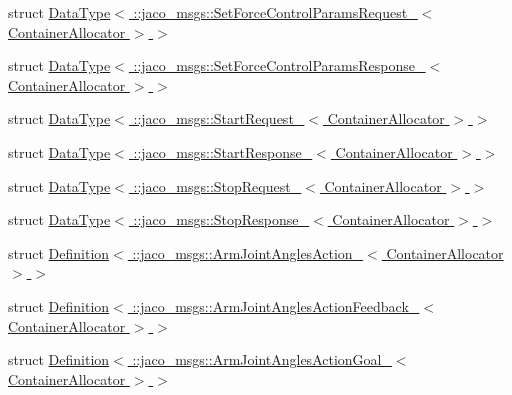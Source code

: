 \begin{DoxyCompactItemize}
\item 
struct \hyperlink{structros_1_1message__traits_1_1DataType_3_01_1_1jaco__msgs_1_1SetForceControlParamsRequest___3_01ContainerAllocator_01_4_01_4}{Data\+Type$<$ \+::jaco\+\_\+msgs\+::\+Set\+Force\+Control\+Params\+Request\+\_\+$<$ Container\+Allocator $>$ $>$}
\item 
struct \hyperlink{structros_1_1message__traits_1_1DataType_3_01_1_1jaco__msgs_1_1SetForceControlParamsResponse___3_01ContainerAllocator_01_4_01_4}{Data\+Type$<$ \+::jaco\+\_\+msgs\+::\+Set\+Force\+Control\+Params\+Response\+\_\+$<$ Container\+Allocator $>$ $>$}
\item 
struct \hyperlink{structros_1_1message__traits_1_1DataType_3_01_1_1jaco__msgs_1_1StartRequest___3_01ContainerAllocator_01_4_01_4}{Data\+Type$<$ \+::jaco\+\_\+msgs\+::\+Start\+Request\+\_\+$<$ Container\+Allocator $>$ $>$}
\item 
struct \hyperlink{structros_1_1message__traits_1_1DataType_3_01_1_1jaco__msgs_1_1StartResponse___3_01ContainerAllocator_01_4_01_4}{Data\+Type$<$ \+::jaco\+\_\+msgs\+::\+Start\+Response\+\_\+$<$ Container\+Allocator $>$ $>$}
\item 
struct \hyperlink{structros_1_1message__traits_1_1DataType_3_01_1_1jaco__msgs_1_1StopRequest___3_01ContainerAllocator_01_4_01_4}{Data\+Type$<$ \+::jaco\+\_\+msgs\+::\+Stop\+Request\+\_\+$<$ Container\+Allocator $>$ $>$}
\item 
struct \hyperlink{structros_1_1message__traits_1_1DataType_3_01_1_1jaco__msgs_1_1StopResponse___3_01ContainerAllocator_01_4_01_4}{Data\+Type$<$ \+::jaco\+\_\+msgs\+::\+Stop\+Response\+\_\+$<$ Container\+Allocator $>$ $>$}
\item 
struct \hyperlink{structros_1_1message__traits_1_1Definition_3_01_1_1jaco__msgs_1_1ArmJointAnglesAction___3_01ContainerAllocator_01_4_01_4}{Definition$<$ \+::jaco\+\_\+msgs\+::\+Arm\+Joint\+Angles\+Action\+\_\+$<$ Container\+Allocator $>$ $>$}
\item 
struct \hyperlink{structros_1_1message__traits_1_1Definition_3_01_1_1jaco__msgs_1_1ArmJointAnglesActionFeedback___f7a0265498d8f0c8bfa24eb4de39e338}{Definition$<$ \+::jaco\+\_\+msgs\+::\+Arm\+Joint\+Angles\+Action\+Feedback\+\_\+$<$ Container\+Allocator $>$ $>$}
\item 
struct \hyperlink{structros_1_1message__traits_1_1Definition_3_01_1_1jaco__msgs_1_1ArmJointAnglesActionGoal___3_01ContainerAllocator_01_4_01_4}{Definition$<$ \+::jaco\+\_\+msgs\+::\+Arm\+Joint\+Angles\+Action\+Goal\+\_\+$<$ Container\+Allocator $>$ $>$}
\item 

\end{DoxyCompactItemize}
